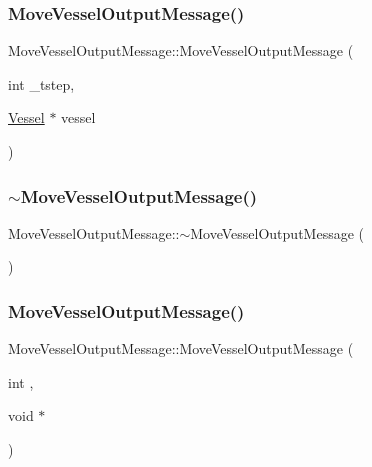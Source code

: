 \subsubsection{\texorpdfstring{MoveVesselOutputMessage()}{MoveVesselOutputMessage()}\hspace{0.1cm}{\footnotesize\ttfamily [1/2]}}
{\footnotesize\ttfamily Move\+Vessel\+Output\+Message\+::\+Move\+Vessel\+Output\+Message (\begin{DoxyParamCaption}\item[{int}]{\+\_\+tstep,  }\item[{\mbox{\hyperlink{class_vessel}{Vessel}} $\ast$}]{vessel }\end{DoxyParamCaption})}

\mbox{\label{class_move_vessel_output_message_aa2aa361694266bb4cd12f8d1d39eba3b}} 
\subsubsection{\texorpdfstring{$\sim$MoveVesselOutputMessage()}{~MoveVesselOutputMessage()}}
{\footnotesize\ttfamily Move\+Vessel\+Output\+Message\+::$\sim$\+Move\+Vessel\+Output\+Message (\begin{DoxyParamCaption}{ }\end{DoxyParamCaption})\hspace{0.3cm}{\ttfamily [inline]}}

\mbox{\label{class_move_vessel_output_message_a715eec2c37304fa9c2a416826804cd4b}} 
\subsubsection{\texorpdfstring{MoveVesselOutputMessage()}{MoveVesselOutputMessage()}\hspace{0.1cm}{\footnotesize\ttfamily [2/2]}}
{\footnotesize\ttfamily Move\+Vessel\+Output\+Message\+::\+Move\+Vessel\+Output\+Message (\begin{DoxyParamCaption}\item[{int}]{,  }\item[{void $\ast$}]{ }\end{DoxyParamCaption})\hspace{0.3cm}{\ttfamily [inline]}}



